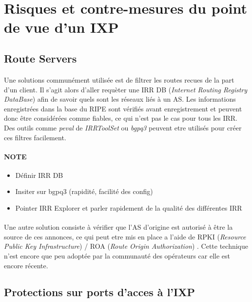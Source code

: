 \section{Risques et contre-mesures du point de vue d'un IXP}

\subsection{Route Servers}

\paragraph{}
Une solutions communément utilisée est de filtrer les routes recues de la part d'un client. Il s'agit alors d'aller requèter une IRR DB (\emph{Internet Routing Registry DataBase}) afin de savoir quels sont les réseaux liés à un AS. Les informations enregistrées dans la base du RIPE sont vérifiés avant enregistrement et peuvent donc être considérées comme fiables, ce qui n'est pas le cas pour tous les IRR. Des outils comme \emph{peval} de \emph{IRRToolSet}\cite{fenioux:IRRTOOLSET} ou \emph{bgpq3}\cite{fenioux:BGPQ3} peuvent etre utilisés pour créer ces filtres facilement.

\paragraph{NOTE}
\begin{itemize}
\item Définir IRR DB
\item Insiter sur bgpq3 (rapidité, facilité des config)
\item Pointer IRR Explorer et parler rapidement de la qualité des différentes IRR
\end{itemize}

\paragraph{}
Une autre solution consiste à vérifier que l'AS d'origine est autorisé à être la source de ces annonces, ce qui peut etre mis en place a l'aide de RPKI (\emph{Resource Public Key Infrastructure}) / ROA (\emph{Route Origin Authorization}) \cite{fenioux:RPKIROA}. Cette technique n'est encore que peu adoptée par la communauté des opérateurs car elle est encore récente.


\subsection{Protections sur ports d'acces à l'IXP}

